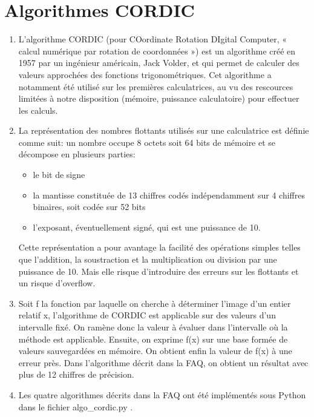 \documentclass{article}
\begin{document}
\section{Algorithmes CORDIC}
\begin{enumerate}
    \item 
    L'algorithme CORDIC (pour COordinate Rotation DIgital Computer, « calcul numérique par rotation de coordonnées ») est un algorithme créé en 1957 par un ingénieur américain, Jack Volder, et qui permet de calculer des valeurs approchées des fonctions trigonométriques. Cet algorithme a notamment été utilisé sur les premières calculatrices, au vu des rescources limitées à notre disposition (mémoire, puissance calculatoire) pour effectuer les calculs.\\
    
    \item
    La représentation des nombres flottants utilisés sur une calculatrice est définie comme suit: un nombre occupe 8 octets soit 64 bits de mémoire et se décompose en plusieurs parties: 
    \begin{itemize}
        \item le bit de signe
        \item la mantisse constituée de 13 chiffres codés indépendamment sur 4 chiffres binaires, soit codée sur 52 bits
        \item l'exposant, éventuellement signé, qui est une puissance de 10.
    \end{itemize}

    Cette représentation a pour avantage la facilité des opérations simples telles que l'addition, la soustraction et la multiplication ou division par une puissance de 10. Mais elle risque d'introduire des erreurs sur les flottants et un risque d'overflow.\\
    
    \item
    Soit f la fonction par laquelle on cherche à déterminer l'image d'un entier relatif x, l'algorithme de CORDIC est applicable sur des valeurs d'un intervalle fixé. On ramène donc la valeur à évaluer dans l'intervalle où la méthode est applicable. Ensuite, on exprime f(x) sur une base formée de valeurs sauvegardées en mémoire. On obtient enfin la valeur de f(x) à une erreur près. Dans l'algorithme décrit dans la FAQ, on obtient un résultat avec plus de 12 chiffres de précision.\\
    
    \item
    Les quatre algorithmes décrits dans la FAQ ont été implémentés sous Python dans le fichier algo\_cordic.py .\\
    

\end{enumerate}
\end{document}

